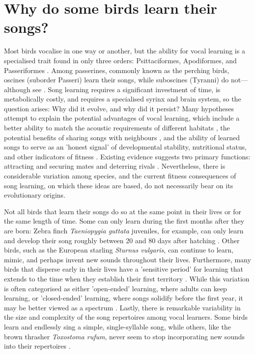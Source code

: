 \section{Why do some birds learn their songs?}
Most birds vocalise in one way or another, but the ability for vocal learning is a specialised trait found in only three orders: Psittaciformes, Apodiformes, and Passeriformes \autocite{kroodsma2004,packert2018}. Among passerines, commonly known as the perching birds, oscines (suborder Passeri) learn their songs, while suboscines (Tyranni) do not---although see \cite{searcy2021,tencate2021}. Song learning requires a significant investment of time, is metabolically costly, and requires a specialised syrinx and brain system, so the question arises: Why did it evolve, and why did it persist? Many hypotheses attempt to explain the potential advantages of vocal learning, which include a better ability to match the acoustic requirements of different habitats \autocite{hansen1979,rios-chelen2012}, the potential benefits of sharing songs with neighbours \autocite{payne1982}, and the ability of learned songs to serve as an 'honest signal' of developmental stability, nutritional status, and other indicators of fitness \autocite{Nowicki2002,ritchie2008}. Existing evidence suggests two primary functions: attracting and securing mates and deterring rivals \autocite{collins2004}. Nevertheless, there is considerable variation among species, and the current fitness consequences of song learning, on which these ideas are based, do not necessarily bear on its evolutionary origins.

Not all birds that learn their songs do so at the same point in their lives or for the same length of time. Some can only learn during the first months after they are born: Zebra finch \textit{Taeniopygia guttata} juveniles, for example, can only learn and develop their song roughly between 20 and 80 days after hatching \autocite{liu2004}. Other birds, such as the European starling \textit{Sturnus vulgaris},  can continue to learn, mimic, and perhaps invent new sounds throughout their lives. Furthermore, many birds that disperse early in their lives have a 'sensitive period' for learning that extends to the time when they establish their first territory \autocite{beecher2005,liu2004}. While this variation is often categorised as either 'open-ended' learning, where adults can keep learning, or 'closed-ended' learning, where songs solidify before the first year, it may be better viewed as a spectrum \autocite{brenowitz2005}. Lastly, there is remarkable variability in the size and complexity of the song repertoires among vocal learners. Some birds learn and endlessly sing a simple, single-syllable song, while others, like the brown thrasher \textit{Toxostoma rufum}, never seem to stop incorporating new sounds into their repertoires \autocite{Boughey1981}.

